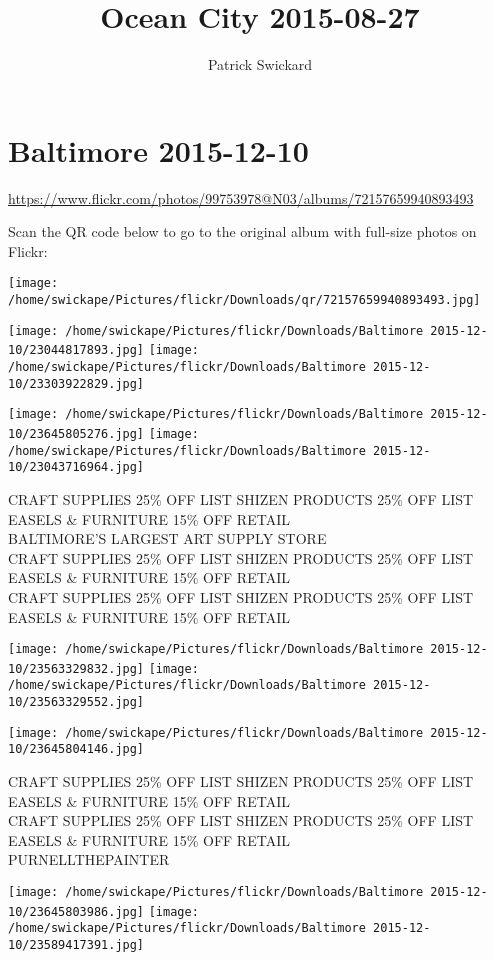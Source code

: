 \documentclass[10pt,letterpaper]{article}
\title{Ocean City 2015-08-27}
\author{Patrick Swickard}
\date{}
\begin{document}
\section*{Baltimore 2015-12-10}

\url{https://www.flickr.com/photos/99753978@N03/albums/72157659940893493}

Scan the QR code below to go to the original album with full-size photos on Flickr:

\texttt{[image: /home/swickape/Pictures/flickr/Downloads/qr/72157659940893493.jpg]}
\pagebreak

\texttt{[image: /home/swickape/Pictures/flickr/Downloads/Baltimore 2015-12-10/23044817893.jpg]}
\texttt{[image: /home/swickape/Pictures/flickr/Downloads/Baltimore 2015-12-10/23303922829.jpg]}

\texttt{[image: /home/swickape/Pictures/flickr/Downloads/Baltimore 2015-12-10/23645805276.jpg]}
\texttt{[image: /home/swickape/Pictures/flickr/Downloads/Baltimore 2015-12-10/23043716964.jpg]}

CRAFT SUPPLIES 25\% OFF LIST SHIZEN PRODUCTS 25\% OFF LIST EASELS \& FURNITURE 15\% OFF RETAIL\\
BALTIMORE'S LARGEST ART SUPPLY STORE\\
CRAFT SUPPLIES 25\% OFF LIST SHIZEN PRODUCTS 25\% OFF LIST EASELS \& FURNITURE 15\% OFF RETAIL\\
CRAFT SUPPLIES 25\% OFF LIST SHIZEN PRODUCTS 25\% OFF LIST EASELS \& FURNITURE 15\% OFF RETAIL
\pagebreak

\texttt{[image: /home/swickape/Pictures/flickr/Downloads/Baltimore 2015-12-10/23563329832.jpg]}
\texttt{[image: /home/swickape/Pictures/flickr/Downloads/Baltimore 2015-12-10/23563329552.jpg]}

\vspace{0.25in}
\texttt{[image: /home/swickape/Pictures/flickr/Downloads/Baltimore 2015-12-10/23645804146.jpg]}

CRAFT SUPPLIES 25\% OFF LIST SHIZEN PRODUCTS 25\% OFF LIST EASELS \& FURNITURE 15\% OFF RETAIL\\
CRAFT SUPPLIES 25\% OFF LIST SHIZEN PRODUCTS 25\% OFF LIST EASELS \& FURNITURE 15\% OFF RETAIL\\
PURNELLTHEPAINTER
\pagebreak

\texttt{[image: /home/swickape/Pictures/flickr/Downloads/Baltimore 2015-12-10/23645803986.jpg]}
\texttt{[image: /home/swickape/Pictures/flickr/Downloads/Baltimore 2015-12-10/23589417391.jpg]}
\end{document}
